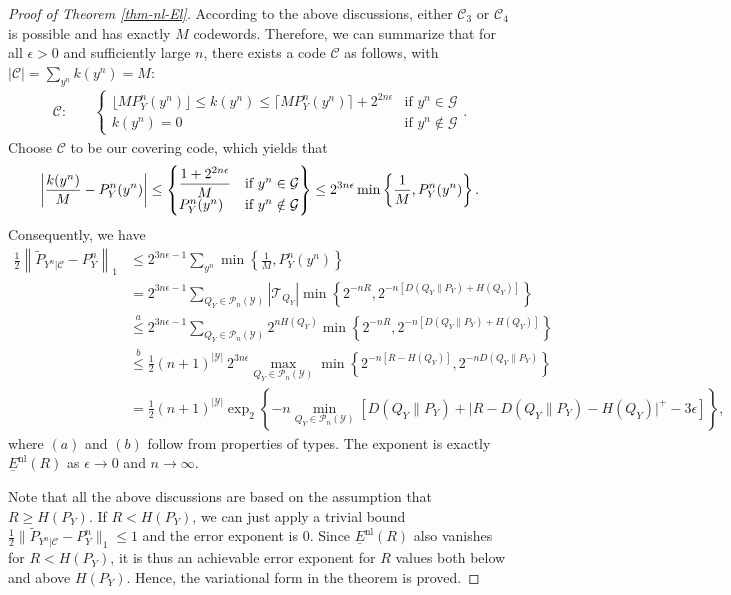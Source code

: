 \documentclass[10pt,a4paper]{amsart}
\newcommand{\El}{\underline{E}}
\newcommand{\TVinText}{\frac12 \big\|\tPy - P_Y^n \big\|_1}
\newcommand{\carY}{|\mY|}
\newcommand{\mC}{\mathcal{C}}
\newcommand{\mG}{\mathcal{G}}
\newcommand{\mP}{\mathcal{P}}
\newcommand{\mT}{\mathcal{T}}
\newcommand{\mY}{\mathcal{Y}}
\newcommand{\nl}{\mathrm{nl}}
\newcommand{\tP}{\tilde{P}}
\newcommand{\tPy}{\tP_{Y^n|\mC}}
\begin{document}
\begin{proof}[Proof of Theorem \ref{thm-nl-El}]
According to the above discussions, either $\mC_3$ or $\mC_4$ is possible and has exactly $M$ codewords. Therefore, we can summarize that for all $\epsilon>0$ and sufficiently large $n$, there exists a code $\mC$ as follows, with $|\mC| = \sum_{y^n} k(y^n) = M$:
\begin{align*}
    \mC: \quad 
    &
    \begin{cases}
        \lfloor MP_Y^n(y^n) \rfloor \leq k(y^n) \leq \lceil MP_Y^n(y^n) \rceil + 2^{2n\epsilon} & \text{if } y^n\in\mG \\
        k(y^n) = 0 & \text{if } y^n\notin\mG
    \end{cases}.
\end{align*}
Choose $\mC$ to be our covering code, which yields that
\[
  \left| \frac{k(y^n)}{M} - P_Y^n(y^n) \right| 
   \leq \left\{\begin{array}{@{}l l@{}}
          \dfrac{1+2^{2n\epsilon}}{M} & \text{if } y^n \in \mG \\
          P_Y^n(y^n) & \text{if } y^n \notin \mG
        \end{array}\right\}
   \leq 2^{3n\epsilon} \min\left\{\frac{1}{M}, P_Y^n(y^n)\right\}. 
\]
Consequently, we have 
\begin{align*}
    \frac12 \left\|\tPy - P_Y^n\right\|_1
    &\leq 2^{3n\epsilon-1}  \sum_{y^n} \min\left\{\frac{1}{M}, P_Y^n(y^n)\right\} \\
    &= 2^{3n\epsilon-1} \sum_{Q_Y\in\mP_n(\mY)} |\mT_{Q_Y}| 
        \min\left\{ 2^{-nR}, 2^{-n\left[D(Q_Y\|P_Y) + H(Q_Y)\right]} \right\} \\
    &\overset{a}{\leq} 2^{3n\epsilon-1} \sum_{Q_Y\in\mP_n(\mY)} 2^{nH(Q_Y)} 
        \min\left\{ 2^{-nR}, 2^{-n\left[D(Q_Y\|P_Y) + H(Q_Y)\right]} \right\} \\
    &\overset{b}{\leq} \frac12(n+1)^{\carY} \ 2^{3n\epsilon} \max_{Q_Y\in\mP_n(\mY)} \min\left\{ 2^{-n[R - H(Q_Y)]}, 2^{-nD(Q_Y\|P_Y)} \right\} \\
    &= \frac12(n+1)^{\carY} \exp_2 \left\{-n \min_{Q_Y\in\mP_n(\mY)} \left[ D(Q_Y\|P_Y) + \big| R - D(Q_Y\|P_Y) - H(Q_Y) \big|^+ - 3\epsilon \right] \right\},
\end{align*}
where $(a)$ and $(b)$ follow from properties of types. The exponent is exactly $\El^\nl(R)$ as $\epsilon\to0$ and $n\to\infty$. 

Note that all the above discussions are based on the assumption that $R\geq H(P_Y)$. If $R<H(P_Y)$, we can just apply a trivial bound $\TVinText\leq1$ and the error exponent is $0$. Since $\El^\nl(R)$ also vanishes for $R<H(P_Y)$, it is thus an achievable error exponent for $R$ values both below and above $H(P_Y)$. Hence, the variational form in the theorem is proved.


\end{proof}
\end{document}
